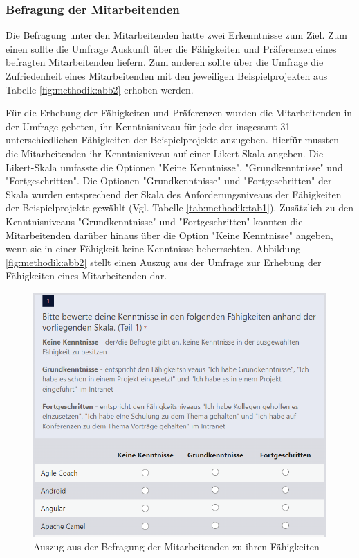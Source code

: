 \subsubsection{Befragung der Mitarbeitenden}
Die Befragung unter den Mitarbeitenden hatte zwei Erkenntnisse zum Ziel.
Zum einen sollte die Umfrage Auskunft über die Fähigkeiten und Präferenzen eines befragten Mitarbeitenden liefern.
Zum anderen sollte über die Umfrage die Zufriedenheit eines Mitarbeitenden mit den jeweiligen Beispielprojekten aus Tabelle \ref{fig:methodik:abb2} erhoben werden.

Für die Erhebung der Fähigkeiten und Präferenzen wurden die Mitarbeitenden in der Umfrage gebeten, ihr Kenntnisniveau für jede der insgesamt 31 unterschiedlichen Fähigkeiten der Beispielprojekte anzugeben.
Hierfür mussten die Mitarbeitenden ihr Kenntnisniveau auf einer Likert-Skala angeben.
Die Likert-Skala umfasste die Optionen "Keine Kenntnisse", "Grundkenntnisse" und "Fortgeschritten".
Die Optionen "Grundkenntnisse" und "Fortgeschritten" der Skala wurden entsprechend der Skala des Anforderungsniveaus der Fähigkeiten der Beispielprojekte gewählt (Vgl. Tabelle \ref{tab:methodik:tab1}).
Zusätzlich zu den Kenntnisniveaus "Grundkenntnisse" und "Fortgeschritten" konnten die Mitarbeitenden darüber hinaus über die Option "Keine Kenntnisse" angeben, wenn sie in einer Fähigkeit keine Kenntnisse beherrschten.
Abbildung \ref{fig:methodik:abb2} stellt einen Auszug aus der Umfrage zur Erhebung der Fähigkeiten eines Mitarbeitenden dar.

\begin{figure}[H]
    \centering
	\includegraphics[width=1\textwidth]{gfx/befragung-faehigkeiten.png}
	\caption[Auszug aus der Befragung der Mitarbeitenden zu ihren Fähigkeiten]{Auszug aus der Befragung der Mitarbeitenden zu ihren Fähigkeiten}
	\label{fig:methodik:abb3}
\end{figure}

